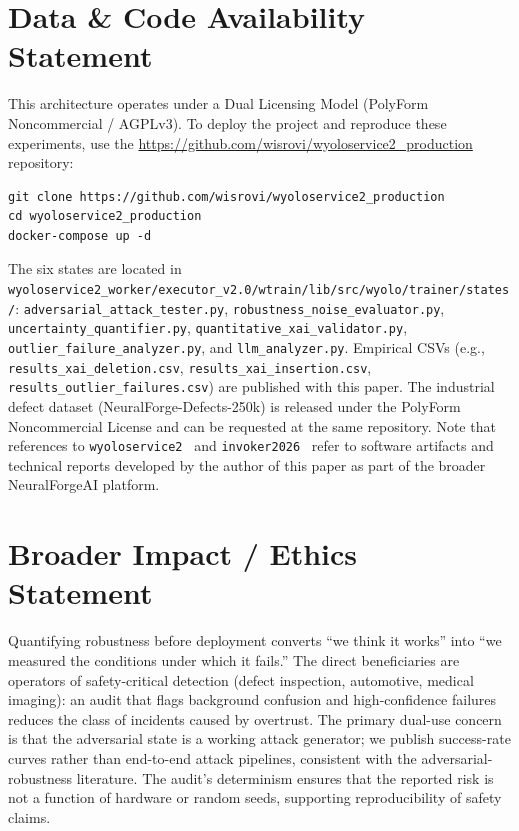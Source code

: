 \documentclass[10pt,twocolumn,letterpaper]{article}
\begin{document}
\section{Data \& Code Availability Statement}
\label{sec:data}
This architecture operates under a Dual Licensing Model (PolyForm Noncommercial / AGPLv3). To deploy the project and reproduce these experiments, use the \url{https://github.com/wisrovi/wyoloservice2\_production} repository:

\begin{verbatim}
git clone https://github.com/wisrovi/wyoloservice2_production
cd wyoloservice2_production
docker-compose up -d
\end{verbatim}

The six states are located in \texttt{wyoloservice2\_worker/executor\_v2.0/wtrain/lib/src/wyolo/trainer/states/}: \texttt{adversarial\_attack\_tester.py}, \texttt{robustness\_noise\_evaluator.py}, \texttt{uncertainty\_quantifier.py}, \texttt{quantitative\_xai\_validator.py}, \texttt{outlier\_failure\_analyzer.py}, and \texttt{llm\_analyzer.py}. Empirical CSVs (e.g., \texttt{results\_xai\_deletion.csv}, \texttt{results\_xai\_insertion.csv}, \texttt{results\_outlier\_failures.csv}) are published with this paper. The industrial defect dataset (NeuralForge-Defects-250k) is released under the PolyForm Noncommercial License and can be requested at the same repository. Note that references to \texttt{wyoloservice2}~\cite{wyoloservice2} and \texttt{invoker2026}~\cite{invoker2026} refer to software artifacts and technical reports developed by the author of this paper as part of the broader NeuralForgeAI platform.

\section{Broader Impact / Ethics Statement}
\label{sec:ethics}
Quantifying robustness before deployment converts ``we think it works'' into ``we measured the conditions under which it fails.'' The direct beneficiaries are operators of safety-critical detection (defect inspection, automotive, medical imaging): an audit that flags background confusion and high-confidence failures reduces the class of incidents caused by overtrust. The primary dual-use concern is that the adversarial state is a working attack generator; we publish success-rate curves rather than end-to-end attack pipelines, consistent with the adversarial-robustness literature. The audit's determinism ensures that the reported risk is not a function of hardware or random seeds, supporting reproducibility of safety claims.
\end{document}
